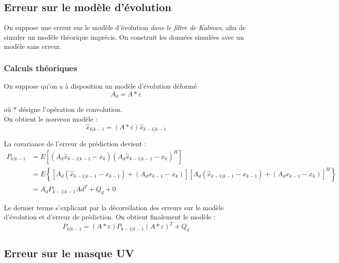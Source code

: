 \documentclass[titlepage]{article}
\begin{document}
	\subsection{Erreur sur le modèle d'évolution}
	
	On suppose une erreur sur le modèle d'évolution \emph{dans le filtre de Kalman}, afin de simuler un modèle théorique imprécis. On construit les données simulées avec un modèle sans erreur.\\
	
	\subsubsection{Calculs théoriques}
	
	On suppose qu'on a à disposition un modèle d'évolution déformé 
	\begin{equation}
		A_d = A\ast\varepsilon
	\end{equation}
	
	où $\ast$ désigne l'opération de convolution. \\
	On obtient le nouveau modèle :
	\begin{equation}
		\widehat{x}_{k|k-1} = \left(A\ast\varepsilon\right)\widehat{x}_{k-1|k-1}
	\end{equation}

	La covariance de l'erreur de prédiction devient :
	\begin{align*}
		P_{k|k-1} &= E\left[\left(A_d\widehat{x}_{k-1|k-1} - x_k\right)\left(A_d\widehat{x}_{k-1|k-1} - x_k\right)^H\right]\\
		&= E\left\{
			\left[
				A_d(\widehat{x}_{k-1|k-1} - x_{k-1}) + (A_dx_{k-1} - x_k)
			\right]\left[
			A_d(\widehat{x}_{k-1|k-1} - x_{k-1}) + (A_dx_{k-1} - x_k)
			\right]^H
		\right\} \\
		&= A_dP_{k-1|k-1}Ad^T + Q_d + 0
	\end{align*}
	
	Le dernier terme s'explicant par la décorrélation des erreurs sur le modèle d'évolution et d'erreur de prédiction. On obtient finalement le modèle :
	\begin{equation}
		P_{k|k-1} = \left(A\ast\varepsilon\right)P_{k-1|k-1}\left(A\ast\varepsilon\right)^T + Q_d
	\end{equation}


	
	\subsection{Erreur sur le masque UV}
	
\end{document}
